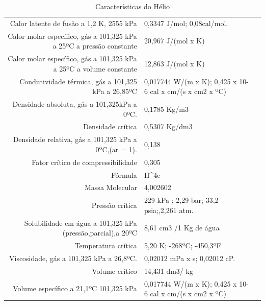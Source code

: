 \begin{table}[h]
\caption{Características do Hélio}
\vspace{0.5cm}
\begin{tabular}{|r||lr}
\hline

Calor latente de fusão a 1,2 K, 2555 kPa & 0,3347 J/mol; 0,08cal/mol.\\
Calor molar específico, gás a 101,325 kPa a 25ºC a pressão constante & 20,967 J/(mol x K) \\ 
Calor molar específico, gás a 101,325 kPa a 25ºC a volume constante  & 12,863 J/(mol x K)                                       \\
Condutividade térmica, gás a 101,325 kPa a 26,85ºC                   & 0,017744 W/(m x K); 0,425 x 10-6 cal x cm/(s x cm2 x ºC) \\
Densidade absoluta, gás a 101,325kPa a 0ºC.                          & 0,1785 Kg/m3                                             \\
Densidade crítica                                                    & 0,5307 Kg/dm3                                            \\
Densidade relativa, gás a 101,325 kPa a 0ºC,(ar = 1).                & 0,138                                                    \\
Fator crítico de compressibilidade                                   & 0,305                                                    \\
Fórmula                                                              & H^4e                                                      \\
Massa Molecular                                                      & 4,002602                                                 \\
Pressão crítica                                                      & 229 kPa ; 2,29 bar; 33,2 psia;,2,261 atm.                \\
Solubilidade em água a 101,325 kPa (pressão,parcial),a 20ºC          & 8,61 cm3 /1 Kg de água                                   \\
Temperatura crítica                                                  & 5,20 K; -268ºC; -450,3ºF                                 \\
Viscosidade, gás a 101,325 kPa a 26,8ºC.                             & 0,02012 mPa x s; 0,02012 cP.                             \\
Volume crítico                                                       & 14,431 dm3/ kg                                           \\
Volume específico a 21,1ºC 101,325 kPa                               & 0,017744 W/(m x K); 0,425 x 10-6 cal x cm/(s x cm2 x ºC)
\hline
\end{tabular}
\end{table}

